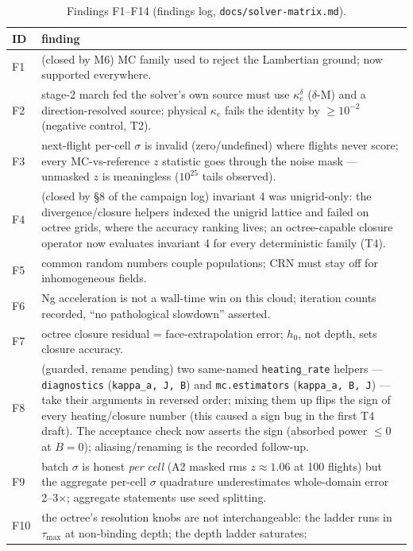\documentclass[11pt,a4paper]{article}
\newcommand{\ke}{\kappa_e}
\begin{document}
\begin{table}[htbp]
\centering\small
\caption{Findings F1--F14 (findings log, \texttt{docs/solver-matrix.md}).}
\label{tab:findings}
\begin{tabular}{@{}p{0.9cm}p{14.8cm}@{}}
\toprule
ID & finding \\
\midrule
F1 & (closed by M6) MC family used to reject the Lambertian ground; now
supported everywhere. \\
F2 & stage-2 march fed the solver's own source must use
$\ke^{\delta}$ ($\delta$-M) and a direction-resolved source; physical
$\ke$ fails the identity by $\ge10^{-2}$ (negative control, T2). \\
F3 & next-flight per-cell $\sigma$ is invalid (zero/undefined) where
flights never score; every MC-vs-reference $z$ statistic goes through the
noise mask --- unmasked $z$ is meaningless ($10^{25}$ tails observed). \\
F4 & (closed by \S8 of the campaign log) invariant 4 was unigrid-only:
the divergence/closure helpers indexed the unigrid lattice and failed on
octree grids, where the accuracy ranking lives; an octree-capable
closure operator now evaluates invariant 4 for every deterministic
family (T4). \\
F5 & common random numbers couple populations; CRN must stay off for
inhomogeneous fields. \\
F6 & Ng acceleration is not a wall-time win on this cloud; iteration
counts recorded, ``no pathological slowdown'' asserted. \\
F7 & octree closure residual = face-extrapolation error; $h_0$, not depth,
sets closure accuracy. \\
F8 & (guarded, rename pending) two same-named \texttt{heating\_rate}
helpers --- \texttt{diagnostics} (\texttt{kappa\_a, J, B}) and
\texttt{mc.estimators} (\texttt{kappa\_a, B, J}) --- take their arguments
in reversed order; mixing them up flips the sign of every
heating/closure number (this caused a sign bug in the first T4 draft).
The acceptance check now asserts the sign (absorbed power $\le0$ at $B=0$);
aliasing/renaming is the recorded follow-up. \\
F9 & batch $\sigma$ is honest \emph{per cell} (A2 masked rms
$z\approx1.06$ at 100 flights) but the aggregate per-cell $\sigma$
quadrature underestimates whole-domain error 2--3$\times$; aggregate
statements use seed splitting. \\
F10 & the octree's resolution knobs are not interchangeable: the ladder
runs in $\tau_{\max}$ at non-binding depth; the depth ladder saturates;

\end{tabular}
\end{table}
\end{document}
